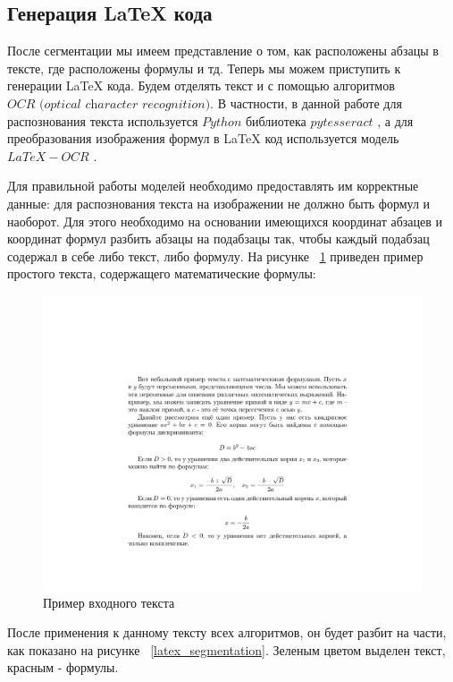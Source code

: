 \subsection{Генерация \LaTeX\; кода}

После сегментации мы имеем представление о том, как расположены абзацы в тексте, где расположены формулы и тд. Теперь мы можем приступить к генерации \LaTeX\; кода.
Будем отделять текст и с помощью алгоритмов $\textit{OCR (optical character recognition)}$. В частности, в данной работе для распознования текста используется $Python$ библиотека $pytesseract$ \cite{pytesseract}, а для преобразования изображения формул в \LaTeX\; код используется модель $LaTeX-OCR$ \cite{LaTeX-OCR}.

Для правильной работы моделей необходимо предоставлять им корректные данные: для распознования текста на изображении не должно быть формул и наоборот. Для этого необходимо на основании имеющихся координат абзацев и координат формул разбить абзацы на подабзацы так, чтобы каждый подабзац содержал в себе либо текст, либо формулу.
На рисунке ~\ref{latex_generate_input} приведен пример простого текста, содержащего математические формулы:

\begin{figure}
    \includegraphics[scale=0.75]{img/latex_generation/input.jpg}
    \caption{Пример входного текста}
    \label{latex_generate_input}
\end{figure}

После применения к данному тексту всех алгоритмов, он будет разбит на части, как показано на рисунке ~\ref{latex_segmentation}. Зеленым цветом выделен текст, красным - формулы.


